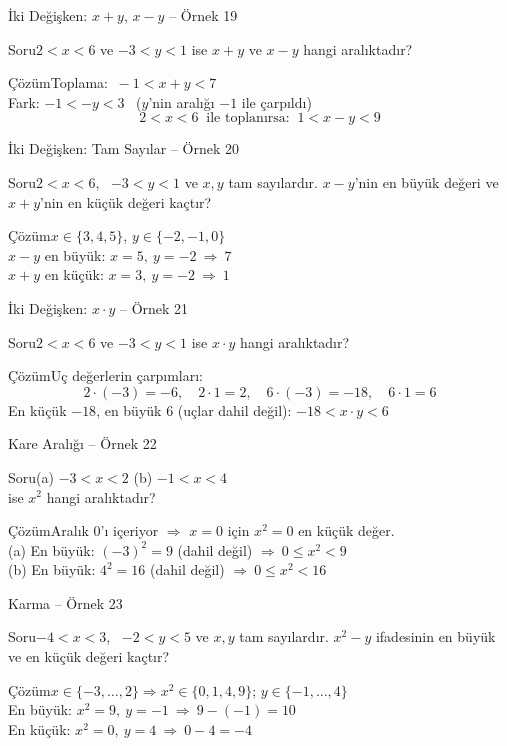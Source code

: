 \documentclass[aspectratio=169,11pt,handout]{beamer}
\newcommand{\soru}[3]{%
\begin{frame}{#1}
  \begin{block}{Soru}\large #2\end{block}
  \pause
  \begin{exampleblock}{Çözüm}\large #3\end{exampleblock}
\end{frame}}
\begin{document}
\soru{İki Değişken: \(x+y\), \(x-y\) -- Örnek 19}
{\(2<x<6\) ve \(-3<y<1\) ise \(x+y\) ve \(x-y\) hangi aralıktadır?}
{Toplama: \(\ -1<x+y<7\)\\[4pt]
Fark: \(-1<-y<3\) \ (\(y\)'nin aralığı \(-1\) ile çarpıldı)
\[2<x<6\ \text{ ile toplanırsa: }\ 1<x-y<9\]}

\soru{İki Değişken: Tam Sayılar -- Örnek 20}
{\(2<x<6\), \ \(-3<y<1\) ve \(x,y\) tam sayılardır. \(x-y\)'nin en büyük değeri ve \(x+y\)'nin en küçük değeri kaçtır?}
{\(x\in\{3,4,5\}\), \quad \(y\in\{-2,-1,0\}\)\\[4pt]
\(x-y\) en büyük: \(x=5,\ y=-2\ \Rightarrow\ 7\)\\
\(x+y\) en küçük: \(x=3,\ y=-2\ \Rightarrow\ 1\)}

\soru{İki Değişken: \(x\cdot y\) -- Örnek 21}
{\(2<x<6\) ve \(-3<y<1\) ise \(x\cdot y\) hangi aralıktadır?}
{Uç değerlerin çarpımları:
\[2\cdot(-3)=-6,\quad 2\cdot 1=2,\quad 6\cdot(-3)=-18,\quad 6\cdot 1=6\]
En küçük \(-18\), en büyük \(6\) (uçlar dahil değil): \quad \(-18<x\cdot y<6\)}

\soru{Kare Aralığı -- Örnek 22}
{(a) \(-3<x<2\) \qquad (b) \(-1<x<4\)\\ ise \(x^2\) hangi aralıktadır?}
{Aralık \(0\)'ı içeriyor \(\Rightarrow\) \(x=0\) için \(x^2=0\) en küçük değer.\\[3pt]
(a) En büyük: \((-3)^2=9\) (dahil değil) \(\Rightarrow\ 0\le x^2<9\)\\
(b) En büyük: \(4^2=16\) (dahil değil) \(\Rightarrow\ 0\le x^2<16\)}

\soru{Karma -- Örnek 23}
{\(-4<x<3\), \ \(-2<y<5\) ve \(x,y\) tam sayılardır. \(x^2-y\) ifadesinin en büyük ve en küçük değeri kaçtır?}
{\(x\in\{-3,\dots,2\}\Rightarrow x^2\in\{0,1,4,9\}\); \quad \(y\in\{-1,\dots,4\}\)\\[4pt]
En büyük: \(x^2=9,\ y=-1\ \Rightarrow\ 9-(-1)=10\)\\
En küçük: \(x^2=0,\ y=4\ \Rightarrow\ 0-4=-4\)}
\end{document}
